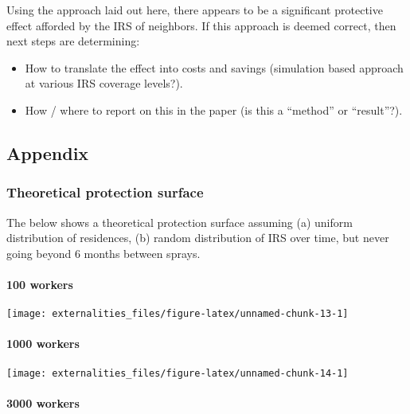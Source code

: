 \documentclass[]{article}
\providecommand{\tightlist}{%
  \setlength{\itemsep}{0pt}\setlength{\parskip}{0pt}}
\let\oldparagraph\paragraph
\renewcommand{\paragraph}[1]{\oldparagraph{#1}\mbox{}}
\begin{document}
Using the approach laid out here, there appears to be a significant
protective effect afforded by the IRS of neighbors. If this approach is
deemed correct, then next steps are determining:

\begin{itemize}
\tightlist
\item
  How to translate the effect into costs and savings (simulation based
  approach at various IRS coverage levels?).
\item
  How / where to report on this in the paper (is this a ``method'' or
  ``result''?).
\end{itemize}

\newpage

\subsection{Appendix}\label{appendix}

\subsubsection{Theoretical protection
surface}\label{theoretical-protection-surface}

The below shows a theoretical protection surface assuming (a) uniform
distribution of residences, (b) random distribution of IRS over time,
but never going beyond 6 months between sprays.

\paragraph{100 workers}\label{workers}

\begin{center}\texttt{[image: externalities\_files/figure-latex/unnamed-chunk-13-1]} \end{center}

\paragraph{1000 workers}\label{workers-1}

\begin{center}\texttt{[image: externalities\_files/figure-latex/unnamed-chunk-14-1]} \end{center}

\paragraph{3000 workers}\label{workers-2}
\end{document}
